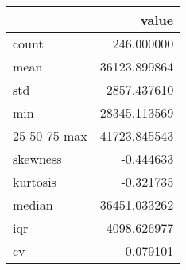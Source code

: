 \begin{tabular}{lr}
\toprule
 & value \\
\midrule
count & 246.000000 \\
mean & 36123.899864 \\
std & 2857.437610 \\
min & 28345.113569 \\
25%
50%
75%
max & 41723.845543 \\
skewness & -0.444633 \\
kurtosis & -0.321735 \\
median & 36451.033262 \\
iqr & 4098.626977 \\
cv & 0.079101 \\
\bottomrule
\end{tabular}
